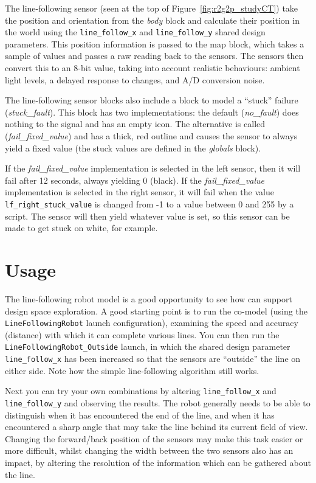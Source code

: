 The line-following sensor (seen at the top of Figure~\ref{fig:r2g2p_studyCT}) take the position and orientation from the \emph{body} block and calculate their position in the world using the \texttt{line\_follow\_x} and \texttt{line\_follow\_y} shared design parameters. This position information is passed to the map block, which takes a sample of values and passes a raw reading back to the sensors. The sensors then convert this to an 8-bit value, taking into account realistic behaviours: ambient light levels, a delayed response to changes, and A/D conversion noise.

The line-following sensor blocks also include a block to model a ``stuck'' failure (\emph{stuck\_fault}). This block has two implementations: the default (\emph{no\_fault}) does nothing to the signal and has an empty icon. The alternative is called (\emph{fail\_fixed\_value}) and has a thick, red outline and causes the sensor to always yield a fixed value (the stuck values are defined in the \emph{globals} block).

If the \emph{fail\_fixed\_value} implementation is selected in the left sensor, then it will fail after 12 seconds, always yielding 0 (black). If the \emph{fail\_fixed\_value} implementation is selected in the right sensor, it will fail when the value \texttt{lf\_right\_stuck\_value} is changed from -1 to a value between 0 and 255 by a script. The sensor will then yield whatever value is set, so this sensor can be made to get stuck on white, for example.


\section{Usage}

The line-following robot model is a good opportunity to see how
\DESTECS can support design space exploration.  A good starting point
is to run the co-model (using the \texttt{LineFollowingRobot} launch configuration), examining the speed and accuracy (distance)
with which it can complete various lines. You can then run the \texttt{LineFollowingRobot\_Outside} launch, in which the shared design parameter \texttt{line\_follow\_x} has been increased so that the sensors are ``outside'' the line on either side. Note how the simple line-following algorithm still works.

Next you can try your own combinations by altering \texttt{line\_follow\_x} and \texttt{line\_follow\_y} and observing the results. The robot generally needs to be able to distinguish when it has encountered the end of the line, and when it has encountered a sharp angle that may take the line behind its
current field of view.  Changing the forward/back position of the
sensors may make this task easier or more difficult, whilst changing
the width between the two sensors also has an impact, by altering the
resolution of the information which can be gathered about the line.

